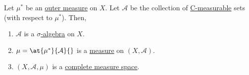 \begin{theorem}\label{thm:Caratheodory-extension-Thm}
	Let \(\mu^{\ast} \) be an \hyperref[def:outer-measure]{outer measure} on \(X\). Let \(\mathcal{A} \) be the collection of \hyperref[def:C-measurable]{C-measurable} sets (with respect to \(\mu^{\ast} \)).
	Then,
	\begin{enumerate}[(1)]
		\item \(\mathcal{A}\) is a \hyperref[def:sigma-algebra]{\(\sigma\)-algebra} on \(X\).
		\item \(\mu = \at{\mu^{\ast} }{\mathcal{A} }{}\) is a \hyperref[def:measure]{measure} on \((X, \mathcal{A})\).
		\item \((X, \mathcal{A} , \mu)\) is a \hyperref[def:complete-measure-space]{complete measure space}.
	\end{enumerate}
\end{theorem}


